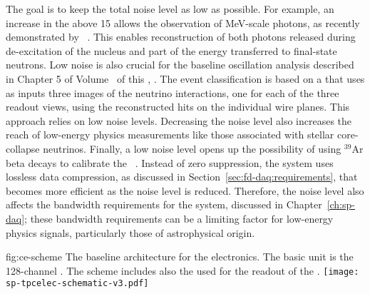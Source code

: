 The goal is to keep the total noise level as low as possible. For example, an 
increase in the  above 15 allows the observation of MeV-scale photons, 
as recently demonstrated by ~\cite{Acciarri:2018myr}. This enables  
reconstruction of both photons released during de-excitation of the nucleus and 
part of the energy transferred to final-state neutrons. Low noise is also crucial
for the baseline oscillation analysis described in Chapter 5 of Volume~\volnumberphysics{} 
of this , \voltitlephysics{}. The event classification is based
on a  that uses as inputs three images of the neutrino interactions, 
one for each of the three readout views, using the reconstructed hits on the 
individual wire planes. This approach relies on low noise levels. Decreasing 
the noise level also increases the reach of low-energy physics measurements 
like those associated with stellar core-collapse  neutrinos. 
Finally, a low noise level opens up the possibility of using $\mathrm{{}^{39}Ar}$ 
beta decays to calibrate the  ~\cite{MICROBOONE-NOTE-1050-PUB}.
Instead of zero suppression, the   system uses lossless 
data compression, as discussed in Section~\ref{sec:fd-daq:requirements}, that
becomes more efficient as the noise level is reduced. Therefore, the noise level 
also affects the bandwidth requirements for the  system,
discussed in Chapter~\ref{ch:sp-daq};
these bandwidth requirements can be a limiting factor for low-energy
physics signals, particularly those of astrophysical origin.

\begin{dunefigure}
{fig:ce-scheme}
{The baseline architecture for the  electronics. The basic unit is the
128-channel . The scheme includes also the
 used for the readout of the .}
\texttt{[image: sp-tpcelec-schematic-v3.pdf]}
\end{dunefigure}

